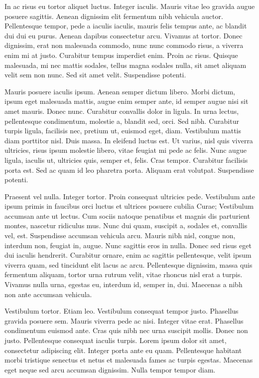 In ac risus eu tortor aliquet luctus. Integer iaculis. Mauris vitae leo gravida augue posuere sagittis. Aenean dignissim elit fermentum nibh vehicula auctor. Pellentesque tempor, pede a iaculis iaculis, mauris felis tempus ante, ac blandit dui dui eu purus. Aenean dapibus consectetur arcu. Vivamus at tortor. Donec dignissim, erat non malesuada commodo, nunc nunc commodo risus, a viverra enim mi at justo. Curabitur tempus imperdiet enim. Proin ac risus. Quisque malesuada, mi nec mattis sodales, tellus magna sodales nulla, sit amet aliquam velit sem non nunc. Sed sit amet velit. Suspendisse potenti.

Mauris posuere iaculis ipsum. Aenean semper dictum libero. Morbi dictum, ipsum eget malesuada mattis, augue enim semper ante, id semper augue nisi sit amet mauris. Donec nunc. Curabitur convallis dolor in ligula. In urna lectus, pellentesque condimentum, molestie a, blandit sed, orci. Sed nibh. Curabitur turpis ligula, facilisis nec, pretium ut, euismod eget, diam. Vestibulum mattis diam porttitor nisl. Duis massa. In eleifend luctus est. Ut varius, nisl quis viverra ultricies, risus ipsum molestie libero, vitae feugiat mi pede ac felis. Nunc augue ligula, iaculis ut, ultricies quis, semper et, felis. Cras tempor. Curabitur facilisis porta est. Sed ac quam id leo pharetra porta. Aliquam erat volutpat. Suspendisse potenti.

Praesent vel nulla. Integer tortor. Proin consequat ultricies pede. Vestibulum ante ipsum primis in faucibus orci luctus et ultrices posuere cubilia Curae; Vestibulum accumsan ante ut lectus. Cum sociis natoque penatibus et magnis dis parturient montes, nascetur ridiculus mus. Nunc dui quam, suscipit a, sodales et, convallis vel, est. Suspendisse accumsan vehicula arcu. Mauris nibh nisl, congue non, interdum non, feugiat in, augue. Nunc sagittis eros in nulla. Donec sed risus eget dui iaculis hendrerit. Curabitur ornare, enim ac sagittis pellentesque, velit ipsum viverra quam, sed tincidunt elit lacus ac arcu. Pellentesque dignissim, massa quis fermentum aliquam, tortor urna rutrum velit, vitae rhoncus nisl erat a turpis. Vivamus nulla urna, egestas eu, interdum id, semper in, dui. Maecenas a nibh non ante accumsan vehicula.

Vestibulum tortor. Etiam leo. Vestibulum consequat tempor justo. Phasellus gravida posuere sem. Mauris viverra pede ac nisi. Integer vitae erat. Phasellus condimentum euismod ante. Cras quis nibh nec urna suscipit mollis. Donec non justo. Pellentesque consequat iaculis turpis. Lorem ipsum dolor sit amet, consectetur adipiscing elit. Integer porta ante eu quam. Pellentesque habitant morbi tristique senectus et netus et malesuada fames ac turpis egestas. Maecenas eget neque sed arcu accumsan dignissim. Nulla tempor tempor diam.

